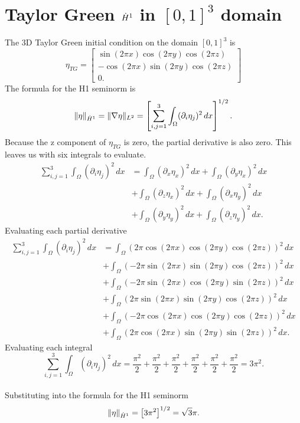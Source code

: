 \chapter{Taylor Green $\dot{H}^1$ in $[0,1]^3$ domain}
\label{app:tg:seminorm:1}

The 3D Taylor Green initial condition on the domain $[0,1]^3$ is
$$\eta_{TG} = \begin{bmatrix}
           \sin(2\pi x)\cos(2\pi y)\cos(2\pi z) \\
           -\cos(2\pi x)\sin(2\pi y)\cos(2\pi z) \\
           0.
         \end{bmatrix}$$
The formula for the H1 seminorm is
$$\|\eta\|_{\dot{H}^1} = \|\nabla\eta\|_{L^2} = \left[ \sum_{i,j=1}^3 \int_{\Omega} (\partial_i\eta_j)^2 \,dx \right]^{1/2}.$$
Because the z component of $\eta_{TG}$ is zero, the partial derivative is also zero. This leaves us with six integrals to evaluate.
\begin{align*}
\sum_{i,j=1}^3 \int_{\Omega} (\partial_i\eta_j)^2 \,dx &= \int_{\Omega} (\partial_x\eta_x)^2 \, dx + \int_{\Omega} (\partial_y\eta_x)^2 \, dx \\
&+ \int_{\Omega} (\partial_z\eta_x)^2 \, dx + \int_{\Omega} (\partial_x\eta_y)^2 \, dx \\ 
&+ \int_{\Omega} (\partial_y\eta_y)^2 \, dx + \int_{\Omega} (\partial_z\eta_y)^2 \, dx.
\end{align*}
Evaluating each partial derivative
\begin{align*}
\sum_{i,j=1}^3 \int_{\Omega} (\partial_i\eta_j)^2 \,dx &= \int_{\Omega} (2\pi \cos(2\pi x)\cos(2\pi y)\cos(2\pi z))^2 \, dx \\ &+ \int_{\Omega} (-2\pi \sin(2\pi x)\sin(2\pi y)\cos(2\pi z))^2 \, dx \\
&+ \int_{\Omega} (-2\pi \sin(2\pi x)\cos(2\pi y)\sin(2\pi z))^2 \, dx \\ &+ \int_{\Omega} (2\pi \sin(2\pi x)\sin(2\pi y)\cos(2\pi z))^2 \, dx \\ 
&+ \int_{\Omega} (-2\pi \cos(2\pi x)\cos(2\pi y)\cos(2\pi z))^2 \, dx \\ &+ \int_{\Omega} (2\pi \cos(2\pi x)\sin(2\pi y)\sin(2\pi z))^2 \, dx.
\end{align*}
Evaluating each integral
$$\sum_{i,j=1}^3 \int_{\Omega} (\partial_i\eta_j)^2 \,dx = \frac{\pi^2}{2} + \frac{\pi^2}{2} + \frac{\pi^2}{2} + \frac{\pi^2}{2} + \frac{\pi^2}{2} + \frac{\pi^2}{2}= 3\pi^2. $$
\\
Substituting into the formula for the H1 seminorm
\\
$$\|\eta\|_{\dot{H}^1} = \left[ 3\pi^2 \right]^{1/2} = \sqrt{3}\pi.$$